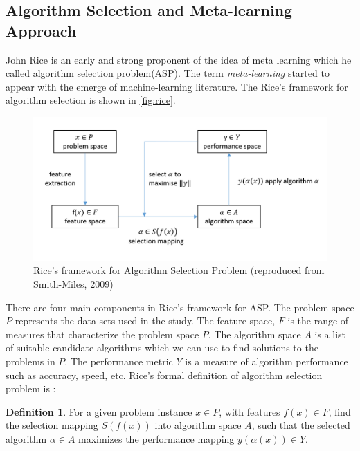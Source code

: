 \documentclass[11pt,a4paper,]{article}
\theoremstyle{definition}
\newtheorem{definition}{Definition}[section]
\theoremstyle{definition}
\theoremstyle{definition}
\theoremstyle{remark}
\begin{document}
\subsection{Algorithm Selection and Meta-learning
Approach}\label{algorithm-selection-and-meta-learning-approach}

John Rice is an early and strong proponent of the idea of meta learning
which he called algorithm selection problem(ASP)\autocite{rice1976}. The
term \emph{meta-learning} started to appear with the emerge of
machine-learning literature. The Rice's framework for algorithm
selection is shown in \autoref{fig:rice}.

\begin{figure}

{\centering \includegraphics[width=\textwidth]{figures/RiceFramework} 

}

\caption{Rice's framework for Algorithm Selection Problem (reproduced from Smith-Miles, 2009)}\label{fig:rice}
\end{figure}

There are four main components in Rice's framework for ASP. The problem
space \(P\) represents the data sets used in the study. The feature
space, \(F\) is the range of measures that characterize the problem
space \(P\). The algorithm space \(A\) is a list of suitable candidate
algorithms which we can use to find solutions to the problems in \(P\).
The performance metric \(Y\) is a measure of algorithm performance such
as accuracy, speed, etc. Rice's formal definition of algorithm selection
problem is \autocite{smith2009cross}:

\begin{definition}
\label{def2}
For a given problem instance $x \in P$, with features $f(x) \in F$, find the selection mapping $S(f(x))$ into algorithm space $A$, such that the selected algorithm $\alpha \in A$ maximizes the performance mapping $y(\alpha(x)) \in Y$.
\end{definition}
\end{document}
